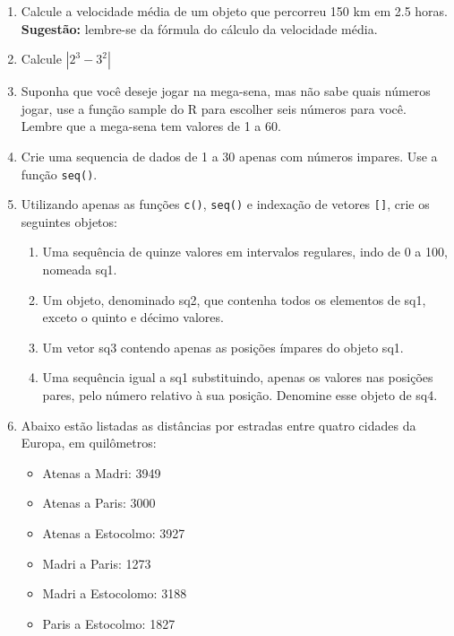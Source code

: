 \documentclass[
]{article}
\providecommand{\tightlist}{%
  \setlength{\itemsep}{0pt}\setlength{\parskip}{0pt}}
\begin{document}
\begin{enumerate}
\def\labelenumi{\arabic{enumi}.}
\setcounter{enumi}{12}
\item
  Calcule a velocidade média de um objeto que percorreu 150 km em 2.5
  horas. \textbf{Sugestão:} lembre-se da fórmula do cálculo da
  velocidade média.
\item
  Calcule \(|2^3-3^2|\)
\item
  Suponha que você deseje jogar na mega-sena, mas não sabe quais números
  jogar, use a função sample do R para escolher seis números para você.
  Lembre que a mega-sena tem valores de 1 a 60.
\item
  Crie uma sequencia de dados de 1 a 30 apenas com números impares. Use
  a função \texttt{seq()}.
\item
  Utilizando apenas as funções \texttt{c()}, \texttt{seq()} e indexação
  de vetores \texttt{{[}{]}}, crie os seguintes objetos:

  \begin{enumerate}
  \def\labelenumii{\alph{enumii}.}
  \tightlist
  \item
    Uma sequência de quinze valores em intervalos regulares, indo de 0 a
    100, nomeada sq1.
  \item
    Um objeto, denominado sq2, que contenha todos os elementos de sq1,
    exceto o quinto e décimo valores.
  \item
    Um vetor sq3 contendo apenas as posições ímpares do objeto sq1.
  \item
    Uma sequência igual a sq1 substituindo, apenas os valores nas
    posições pares, pelo número relativo à sua posição. Denomine esse
    objeto de sq4.
  \end{enumerate}
\item
  Abaixo estão listadas as distâncias por estradas entre quatro cidades
  da Europa, em quilômetros:

  \begin{itemize}
  \tightlist
  \item
    Atenas a Madri: 3949
  \item
    Atenas a Paris: 3000
  \item
    Atenas a Estocolmo: 3927
  \item
    Madri a Paris: 1273
  \item
    Madri a Estocolomo: 3188
  \item
    Paris a Estocolmo: 1827
  \end{itemize}
\end{enumerate}
\end{document}
